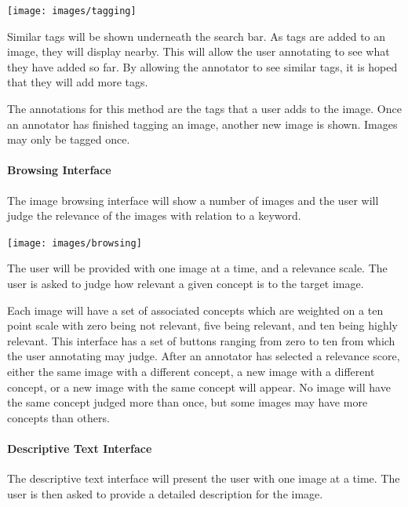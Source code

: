 \documentclass[12pt,a4paper]{article}
\begin{document}
\begin{center}
    \texttt{[image: images/tagging]}
\end{center}

Similar tags will be shown underneath the search bar. As tags are added to an image, they will display nearby. This will allow the user annotating to see what they have added so far. By allowing the annotator to see similar tags, it is hoped that they will add more tags. 

The annotations for this method are the tags that a user adds to the image. Once an annotator has finished tagging an image, another new image is shown. Images may only be tagged once.
\pagebreak
\paragraph{Browsing Interface}
The image browsing interface will show a number of images and the user will judge the relevance of the images with relation to a keyword.

\begin{center}
    \texttt{[image: images/browsing]}
\end{center}

The user will be provided with one image at a time, and a relevance scale. The user is asked to judge how relevant a given concept is to the target image. 

Each image will have a set of associated concepts which are weighted on a ten point scale with zero being not relevant, five being relevant, and ten being highly relevant. This interface has a set of buttons ranging from zero to ten from which the user annotating may judge. After an annotator has selected a relevance score, either the same image with a different concept, a new image with a different concept, or a new image with the same concept will appear. No image will have the same concept judged more than once, but some images may have more concepts than others.
\pagebreak
\paragraph{Descriptive Text Interface}
The descriptive text interface will present the user with one image at a time. The user is then asked to provide a detailed description for the image.
\end{document}
